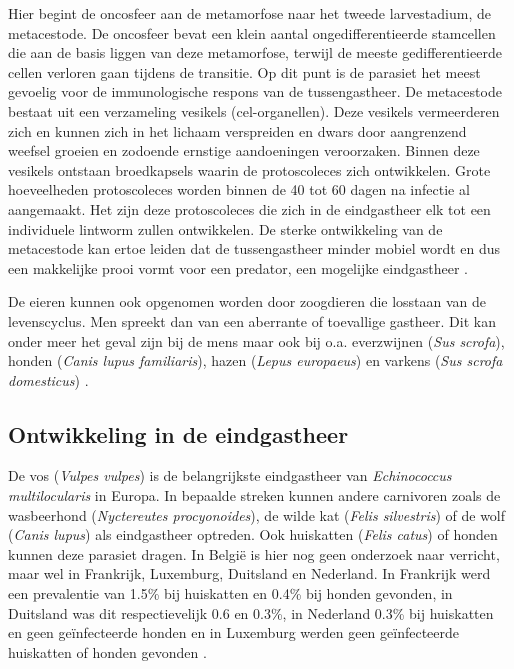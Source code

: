 \documentclass[twoside]{extreport}
\begin{document}
\newpage

Hier begint de oncosfeer aan de metamorfose naar het tweede
larvestadium, de metacestode. De oncosfeer bevat een klein aantal
ongedifferentieerde stamcellen die aan de basis liggen van deze
metamorfose, terwijl de meeste gedifferentieerde cellen verloren gaan
tijdens de transitie. Op dit punt is de parasiet het meest gevoelig voor
de immunologische respons van de tussengastheer. De metacestode bestaat
uit een verzameling vesikels (cel-organellen). Deze vesikels
vermeerderen zich en kunnen zich in het lichaam verspreiden en dwars
door aangrenzend weefsel groeien en zodoende ernstige aandoeningen
veroorzaken. Binnen deze vesikels ontstaan broedkapsels waarin de
protoscoleces zich ontwikkelen. Grote hoeveelheden protoscoleces worden
binnen de 40 tot 60 dagen na infectie al aangemaakt. Het zijn deze
protoscoleces die zich in de eindgastheer elk tot een individuele
lintworm zullen ontwikkelen. De sterke ontwikkeling van de metacestode
kan ertoe leiden dat de tussengastheer minder mobiel wordt en dus een
makkelijke prooi vormt voor een predator, een mogelijke eindgastheer
\citep{eckert2001oie}.

De eieren kunnen ook opgenomen worden door zoogdieren die losstaan van
de levenscyclus. Men spreekt dan van een aberrante of toevallige
gastheer. Dit kan onder meer het geval zijn bij de mens maar ook bij
o.a. everzwijnen (\emph{Sus scrofa}), honden (\emph{Canis lupus
familiaris}), hazen (\emph{Lepus europaeus}) en varkens (\emph{Sus
scrofa domesticus})
\citep{oksanen2016geographical, chaignat2015brown, romig2017ecology}.

\subsection{Ontwikkeling in de
eindgastheer}\label{ontwikkeling-in-de-eindgastheer}

De vos (\emph{Vulpes vulpes}) is de belangrijkste eindgastheer van
\emph{Echinococcus multilocularis} in Europa. In bepaalde streken kunnen
andere carnivoren zoals de wasbeerhond (\emph{Nyctereutes
procyonoides}), de wilde kat (\emph{Felis silvestris}) of de wolf
(\emph{Canis lupus}) als eindgastheer optreden. Ook huiskatten
(\emph{Felis catus}) of honden kunnen deze parasiet dragen. In België is
hier nog geen onderzoek naar verricht, maar wel in Frankrijk, Luxemburg,
Duitsland en Nederland. In Frankrijk werd een prevalentie van 1.5\% bij
huiskatten en 0.4\% bij honden gevonden, in Duitsland was dit
respectievelijk 0.6 en 0.3\%, in Nederland 0.3\% bij huiskatten en geen
geïnfecteerde honden en in Luxemburg werden geen geïnfecteerde
huiskatten of honden gevonden \citep{oksanen2016geographical}.
\end{document}
